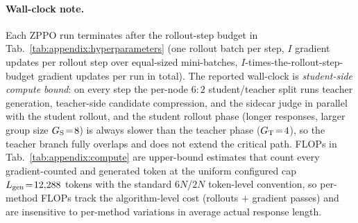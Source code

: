 \documentclass{llmxive}
\begin{document}
\paragraph{Wall-clock note.} Each ZPPO run terminates after the rollout-step budget in Tab.~\ref{tab:appendix:hyperparameters} (one rollout batch per step, $I$ gradient updates per rollout step over equal-sized mini-batches, $I$-times-the-rollout-step-budget gradient updates per run in total). The reported wall-clock is \emph{student-side compute bound}: on every step the per-node $6\!:\!2$ student/teacher split runs teacher generation, teacher-side candidate compression, and the sidecar judge in parallel with the student rollout, and the student rollout phase (longer responses, larger group size $G_{\rm S}\!=\!8$) is always slower than the teacher phase ($G_{\rm T}\!=\!4$), so the teacher branch fully overlaps and does not extend the critical path. FLOPs in Tab.~\ref{tab:appendix:compute} are upper-bound estimates that count every gradient-counted and generated token at the uniform configured cap $L_{\rm gen}\!=\!12{,}288$ tokens with the standard $6N$/$2N$ token-level convention, so per-method FLOPs track the algorithm-level cost (rollouts $+$ gradient passes) and are insensitive to per-method variations in average actual response length.
\end{document}
